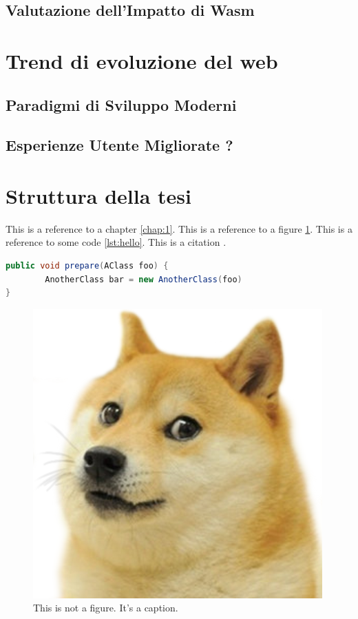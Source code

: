 \subsection{Valutazione dell'Impatto di Wasm}




\section{Trend di evoluzione del web}
\label{sec:Trend}
\subsection{Paradigmi di Sviluppo Moderni}

\subsection{Esperienze Utente Migliorate ?}



\section{Struttura della tesi}
\label{sec:struttura}

This is a reference to a chapter \ref{chap:1}. This is a reference to a figure \ref{fig:doge}. This is a reference to some code \ref{lst:hello}. This is a citation \cite{famous:paper}.



\begin{lstlisting}[language=Java, label=lst:java, caption={Some code in another language than the default one}]
public void prepare(AClass foo) {
        AnotherClass bar = new AnotherClass(foo)
}
\end{lstlisting}


\begin{figure}
\begin{center}
\includegraphics[width=0.3\columnwidth]{images/doge.png}
\end{center}
\caption{This is not a figure. It's a caption.}
\label{fig:doge}
\end{figure}
